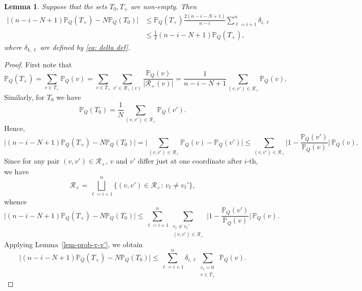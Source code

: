 \documentclass[12pt]{article}
\newtheorem{lemma}[theorem]{Lemma}
\theoremstyle{definition}
\theoremstyle{plain}
\def\Prob{{\mathbb P}}
\def\relation{{\mathcal R}}
\begin{document}
\begin{lemma}\label{lem-prob-T+}
Suppose that the sets $T_0,T_+$ are non-empty.
Then
\begin{align*}
\big\vert (n-i-N+1)\Prob_Q(T_+)-N\Prob_Q(T_0)\big\vert
&\leq \Prob_Q(T_+) \frac{2(n-i-N+1)}{n-i} \sum_{\ell=i+1}^n \delta_{i,\ell}\\
&\leq \frac{1}{2}(n-i-N+1)\Prob_Q(T_+),
\end{align*}
where $\delta_{k,\ell}$ are defined by \eqref{eq: delta def}.
\end{lemma}
\begin{proof}
First note that 
$$
\Prob_Q(T_+)=\sum_{v\in T_+} \Prob_Q(v)
=\sum_{v\in T_+}\sum_{v'\in \relation_+(v)} \frac{\Prob_Q(v)}{\vert \relation_+(v)\vert}
=\frac{1}{n-i-N+1}\sum_{(v,v')\in \relation_+} \Prob_Q(v). 
$$
Similarly, for $T_0$ we have
$$\Prob_Q(T_0)=\frac{1}{N}\sum_{(v,v')\in \relation_+} \Prob_Q(v').$$
Hence,
$$
\big\vert (n-i-N+1)\Prob_Q(T_+)-N\Prob_Q(T_0)\big\vert 
=\big\vert \sum_{(v,v')\in \relation_+} \Prob_Q(v)-\Prob_Q(v')\big\vert
\leq \sum_{(v,v')\in \relation_+} \Big\vert 1-\frac{\Prob_Q(v')}{\Prob_Q(v)}\Big\vert\, \Prob_Q(v).
$$
Since for any pair $(v,v')\in \relation_+$, $v$ and $v'$ differ just at one coordinate after $i$-th, we have
$$\relation_+=\bigsqcup_{\ell=i+1}^n \bigl\{(v,v')\in \relation_+:\,v_\ell\neq v_{\ell}'\bigr\},$$
whence
$$
\big\vert (n-i-N+1)\Prob_Q(T_+)-N\Prob_Q(T_0)\big\vert 
\leq \sum_{\ell=i+1}^n \sum_{\substack{v_\ell\neq v_{\ell}'\\(v,v')\in \relation_+}}
\Big\vert 1-\frac{\Prob_Q(v')}{\Prob_Q(v)}\Big\vert\, \Prob_Q(v).
$$
Applying Lemma~\ref{lem-prob-v-v'}, we obtain 
\begin{equation}\label{eq1-lem-prob-T+}
\big\vert (n-i-N+1)\Prob_Q(T_+)-N\Prob_Q(T_0)\big\vert 
\leq \sum_{\ell=i+1}^n \delta_{i,\ell}\sum_{\substack{v_\ell=0\\ v\in T_+}} \, \Prob_Q(v).
\end{equation}


\end{proof}
\end{document}
